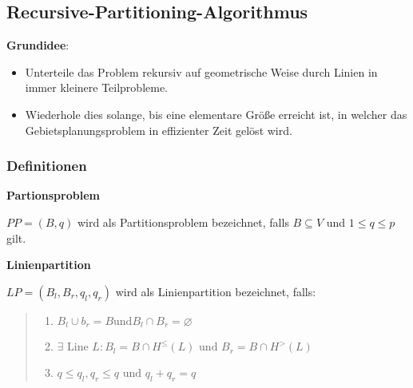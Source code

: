       

      \subsection{Recursive-Partitioning-Algorithmus} %
      \label{sub:recursive_partitioning_algorithmus}

        \par {\color{blue}{(Bsp: Aufgabe 19)}}

        \par \textbf{Grundidee}:
          \begin{itemize}
             \item Unterteile das Problem rekursiv auf geometrische Weise durch Linien in immer kleinere Teilprobleme.
             \item Wiederhole dies solange, bis eine elementare Größe erreicht ist, in welcher das Gebietsplanungsproblem in effizienter Zeit gelöst wird.
           \end{itemize} 

        \subsubsection{Definitionen} %
        \label{ssub:definitionen}

          \par \textbf{Partionsproblem}

          \par $PP = (B, q)$ wird als Partitionsproblem bezeichnet, falls $B \subseteq V$ und $1 \leq q \leq p$ gilt.\\
        
          \par \textbf{Linienpartition}

          \par $LP = (B_l, B_r, q_l, q_r)$ wird als Linienpartition bezeichnet, falls:
            \begin{quote}
              \begin{enumerate}
                \item $B_l \cup b_r = B \text{und} B_l \cap B_r = \varnothing$
                \item $\exists \text{ Line } L: B_l = B \cap H^{\leq}(L) \text{ und } B_r = B \cap H^{>}(L)$
                \item $q \leq q_l, q_r \leq q \text{ und } q_l + q_r = q$
              \end{enumerate}
            \end{quote}

